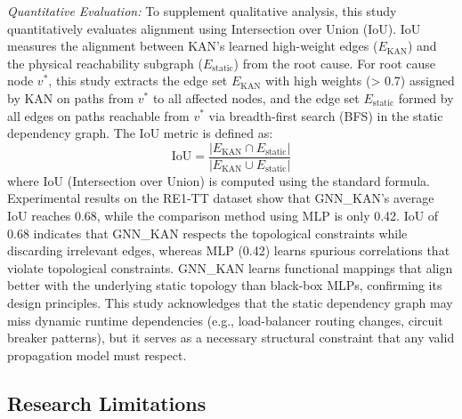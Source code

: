 \documentclass[conference]{IEEEtran}
\begin{document}
\textit{Quantitative Evaluation:} To supplement qualitative analysis, this study quantitatively evaluates alignment using Intersection over Union (IoU). IoU measures the alignment between KAN's learned high-weight edges ($E_{\text{KAN}}$) and the physical reachability subgraph ($E_{\text{static}}$) from the root cause. For root cause node $v^*$, this study extracts the edge set $E_{\text{KAN}}$ with high weights (> 0.7) assigned by KAN on paths from $v^*$ to all affected nodes, and the edge set $E_{\text{static}}$ formed by all edges on paths reachable from $v^*$ via breadth-first search (BFS) in the static dependency graph. The IoU metric is defined as:
\begin{equation}
\text{IoU} = \frac{|E_{\text{KAN}} \cap E_{\text{static}}|}{|E_{\text{KAN}} \cup E_{\text{static}}|}
\end{equation}
where IoU (Intersection over Union) is computed using the standard formula.
Experimental results on the RE1-TT dataset show that GNN\_KAN's average IoU reaches 0.68, while the comparison method using MLP is only 0.42. IoU of 0.68 indicates that GNN\_KAN respects the topological constraints while discarding irrelevant edges, whereas MLP (0.42) learns spurious correlations that violate topological constraints. GNN\_KAN learns functional mappings that align better with the underlying static topology than black-box MLPs, confirming its design principles. This study acknowledges that the static dependency graph may miss dynamic runtime dependencies (e.g., load-balancer routing changes, circuit breaker patterns), but it serves as a necessary structural constraint that any valid propagation model must respect.


\subsection{Research Limitations}
\end{document}
